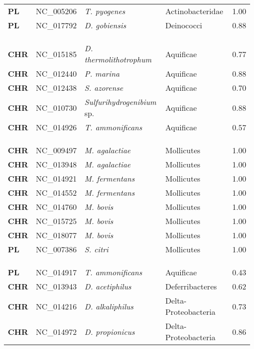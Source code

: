 \begin{adjustwidth}{-3cm}{2cm}
{\begin{supertabular}{>{\bfseries}l|p{0.1\textwidth}p{0.14\textwidth}l|l}
PL & NC\_005206 & \textit{T. pyogenes} & Actinobacteridae & 1.00\\
PL & NC\_017792 & \textit{D. gobiensis} & Deinococci & 0.88\\
\\
\\
\hline\\
CHR & NC\_015185 &  \textit{D. thermolithotrophum} & Aquificae & 0.77\\
CHR & NC\_012440 &  \textit{P. marina} & Aquificae & 0.88\\
CHR & NC\_012438 &  \textit{S. azorense} & Aquificae & 0.70\\
CHR & NC\_010730 &  \textit{Sulfurihydrogenibium} sp. & Aquificae & 0.88\\
CHR & NC\_014926 &  \textit{T. ammonificans} & Aquificae & 0.57\\
\\
\\
\hline\\
CHR & NC\_009497 & \textit{M. agalactiae} & Mollicutes & 1.00\\
CHR & NC\_013948 & \textit{M. agalactiae }& Mollicutes & 1.00\\
CHR & NC\_014921 & \textit{M. fermentans} & Mollicutes & 1.00\\
CHR & NC\_014552 & \textit{M. fermentans} & Mollicutes & 1.00\\
CHR & NC\_014760 & \textit{M. bovis} & Mollicutes & 1.00\\
CHR & NC\_015725 & \textit{M. bovis} & Mollicutes & 1.00\\
CHR & NC\_018077 & \textit{M. bovis} & Mollicutes & 1.00\\
PL & NC\_007386 & \textit{S. citri} & Mollicutes & 1.00\\
\\
\\
\hline\\
PL & NC\_014917 & \textit{T. ammonificans} & Aquificae & 0.43\\
CHR & NC\_013943 & \textit{D. acetiphilus} & Deferribacteres & 0.62\\
CHR & NC\_014216 & \textit{D. alkaliphilus} & Delta-Proteobacteria & 0.73\\
CHR & NC\_014972 & \textit{D. propionicus} & Delta-Proteobacteria & 0.86\\

\end{supertabular}}
\end{adjustwidth}
